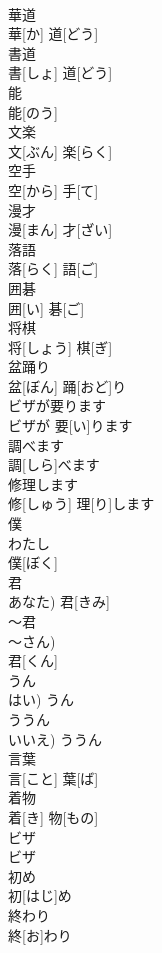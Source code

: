\documentclass[8pt]{extreport}
\begin{document}
\begin{CJK}{UTF8}{min}
\\	華道	
\\	華[か] 道[どう]		
\\	書道	
\\	書[しょ] 道[どう]		
\\	能	
\\	能[のう]		
\\	文楽	
\\	文[ぶん] 楽[らく]		
\\	空手	
\\	空[から] 手[て]		
\\	漫才	
\\	漫[まん] 才[ざい]		
\\	落語	
\\	落[らく] 語[ご]		
\\	囲碁	
\\	囲[い] 碁[ご]		
\\	将棋	
\\	将[しょう] 棋[ぎ]		
\\	盆踊り	
\\	盆[ぼん] 踊[おど]り		
\\	ビザが要ります	
\\	ビザが 要[い]ります		
\\	調べます	
\\	調[しら]べます		
\\	修理します	
\\	修[しゅう] 理[り]します		
\\	僕	
\\	わたし 
\\	僕[ぼく]		
\\	君	
\\	あなた)	君[きみ]		
\\	～君	
\\	～さん)	
\\	君[くん]		
\\	うん	
\\	はい)	うん		
\\	ううん	
\\	いいえ)	ううん		
\\	言葉	
\\	言[こと] 葉[ば]		
\\	着物	
\\	着[き] 物[もの]		
\\	ビザ	
\\	ビザ		
\\	初め	
\\	初[はじ]め		
\\	終わり	
\\	終[お]わり		

\end{CJK}
\end{document}
